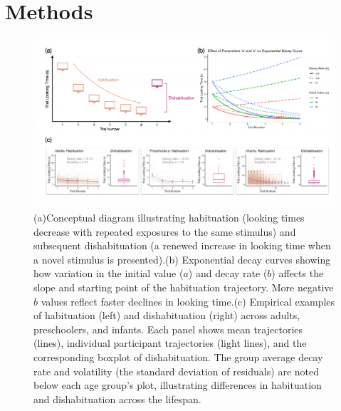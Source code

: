 \documentclass[10pt, letterpaper]{article}
\newenvironment{CodeChunk}{}{}
\begin{document}
\hypertarget{methods}{%
\section{Methods}\label{methods}}

\captionsetup{belowskip=0pt,aboveskip=0pt}

\begin{CodeChunk}
\begin{figure}[h]

{\centering \includegraphics{figs/experimental_design-1} 

}

\caption[(a)Conceptual diagram illustrating habituation (looking times decrease with repeated exposures to the same stimulus) and subsequent dishabituation (a renewed increase in looking time when a novel stimulus is presented).(b) Exponential decay curves showing how variation in the initial value ($a$) and decay rate ($b$) affects the slope and starting point of the habituation trajectory]{(a)Conceptual diagram illustrating habituation (looking times decrease with repeated exposures to the same stimulus) and subsequent dishabituation (a renewed increase in looking time when a novel stimulus is presented).(b) Exponential decay curves showing how variation in the initial value ($a$) and decay rate ($b$) affects the slope and starting point of the habituation trajectory. More negative $b$ values reflect faster declines in looking time.(c) Empirical examples of habituation (left) and dishabituation (right) across adults, preschoolers, and infants. Each panel shows mean trajectories (lines), individual participant trajectories (light lines), and the corresponding boxplot of dishabituation. The group average decay rate and volatility (the standard deviation of residuals) are noted below each age group’s plot, illustrating differences in habituation and dishabituation across the lifespan.}\label{fig:experimental_design}
\end{figure}
\end{CodeChunk}
\end{document}
